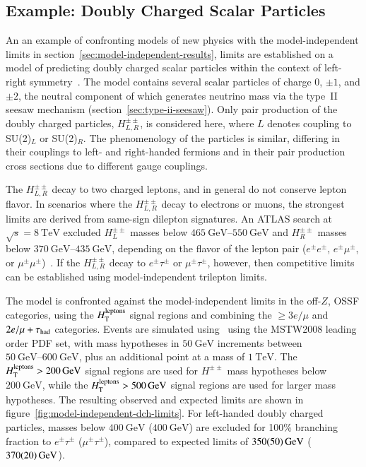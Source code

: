 \subsection{Example: Doubly Charged Scalar Particles}
An an example of confronting models of new physics with the model-independent limits in section~\ref{sec:model-independent-results}, limits are established on a model of predicting doubly charged scalar particles within the context of left-right symmetry~\cite{Pati:1974yy,Mohapatra:1974hk,Senjanovic:1975rk,Rizzo:1981xx}. The model contains several scalar particles of charge 0, $\pm1$, and $\pm2$, the neutral component of which generates neutrino mass via the type~II seesaw mechanism (section~\ref{sec:type-ii-seesaw}). Only pair production of the doubly charged particles, $H^{\pm\pm}_{L,R}$, is considered here, where $L$ denotes coupling to SU(2)$_L$ or SU(2)$_R$. The phenomenology of the particles is similar, differing in their couplings to left- and right-handed fermions and in their pair production cross sections due to different gauge couplings. 

The $H^{\pm\pm}_{L,R}$ decay to two charged leptons, and in general do not conserve lepton flavor. In scenarios where the $H^{\pm\pm}_{L,R}$ decay to electrons or muons, the strongest limits are derived from same-sign dilepton signatures. An ATLAS search at $\sqrt{s}=\SI{8}{\tera\electronvolt}$ excluded $H^{\pm\pm}_L$ masses below $\SIrange{465}{550}{\giga\electronvolt}$ and $H^{\pm\pm}_R$ masses below $\SIrange{370}{435}{\giga\electronvolt}$, depending on the flavor of the lepton pair ($e^{\pm}e^{\pm}$, $e^{\pm}\mu^{\pm}$, or $\mu^{\pm}\mu^{\pm}$)~\cite{TheATLASCollaboration:2015gu}. If the $H^{\pm\pm}_{L,R}$ decay to $e^{\pm}\tau^{\pm}$ or $\mu^{\pm}\tau^{\pm}$, however, then competitive limits can be established using model-independent trilepton limits. 

The model is confronted against the model-independent limits in the off-$Z$, OSSF categories, using the $H_{\mathrm{T}}^{\mathrm{leptons}}$ signal regions and combining the $\geq3e/\mu$ and $2e/\mu+\tau_\mathrm{had}$ categories. Events are simulated using \ using the MSTW2008 leading order PDF set, with mass hypotheses in $\SI{50}{\giga\electronvolt}$ increments between $\SIrange{50}{600}{\giga\electronvolt}$, plus an additional point at a mass of $\SI{1}{\tera\electronvolt}$. The $H_{\mathrm{T}}^{\mathrm{leptons}}>\SI{200}{\giga\electronvolt}$ signal regions are used for $H^{\pm\pm}$ mass hypotheses below $\SI{200}{\giga\electronvolt}$, while the $H_{\mathrm{T}}^{\mathrm{leptons}}>\SI{500}{\giga\electronvolt}$ signal regions are used for larger mass hypotheses. The resulting observed and expected limits are shown in figure~\ref{fig:model-independent-dch-limits}. For left-handed doubly charged particles, masses below $\SI{400}{\giga\electronvolt}$ ($\SI{400}{\giga\electronvolt}$) are excluded for 100\% branching fraction to $e^{\pm}\tau^{\pm}$ ($\mu^{\pm}\tau^{\pm}$), compared to expected limits of $\SI{350\pm50}{\giga\electronvolt}$ ($\SI{370\pm20}{\giga\electronvolt}$). 


